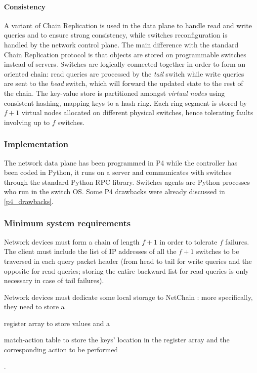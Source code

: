 \paragraph{Consistency}
A variant of Chain Replication \cite{chainreplication} is used in the data plane to handle read and write queries and to ensure strong consistency, while switches reconfiguration is handled by the network control plane.
The main difference with the standard Chain Replication \cite{chainreplication} protocol is that objects are stored on programmable switches instead of servers.
Switches are logically connected together in order to form an oriented chain: read queries are processed by the \textit{tail} switch while write queries are sent to the \textit{head} switch, which will forward the updated state to the rest of the chain.
The key-value store is partitioned amongst \textit{virtual nodes} using consistent hashing, mapping keys to a hash ring.
Each ring segment is stored by $f + 1$ virtual nodes allocated on different physical switches, hence tolerating faults involving up to $f$ switches.

\subsubsection{Implementation}
The network data plane has been programmed in P4 \cite{p4} while the controller has been coded in Python, it runs on a server and communicates with switches through the standard Python RPC library. Switches agents are Python processes who run in the switch OS. Some P4 \cite{p4} drawbacks were already discussed in \cref{p4_drawbacks}.

\subsubsection{Minimum system requirements}
Network devices must form a chain of length $f + 1$ in order to tolerate $f$ failures. The client must include the list of IP addresses of all the $f + 1$ switches to be traversed in each query packet header (from head to tail for write queries and the opposite
for read queries; storing the entire backward list for read queries is only necessary in case of tail failures).\par
Network devices must dedicate some local storage to NetChain \cite{netchain}: more specifically, they need to store a
\begin{mylist}
    \item register array to store values and a
    \item match-action table to store the keys' location in the register array and the corresponding action to be performed
\end{mylist}.

